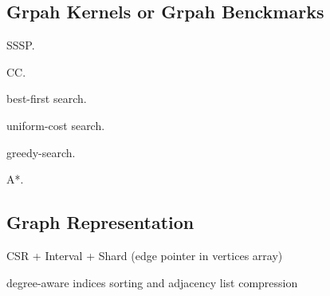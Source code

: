 \documentclass[UTF8,12pt,a4paper]{article}
\begin{document}
\subsection{Grpah Kernels or Grpah Benckmarks}
\begin{compactitem}
  \item SSSP.
  \item CC.
  \item best-first search.
  \item uniform-cost search.
  \item greedy-search.
  \item A*.
\end{compactitem}

\subsection{Graph Representation}
\begin{compactitem}
  \item CSR + Interval + Shard (edge pointer in vertices array)~\cite{DBLP:conf/sbac-pad/ZhouP17}
  \item degree-aware indices sorting and adjacency list compression~\cite{DBLP:conf/fpga/ZhangL18}
\end{compactitem}
\end{document}
